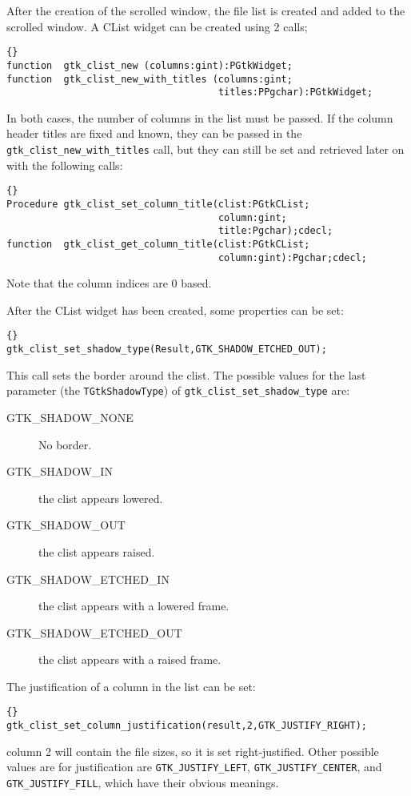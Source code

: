 \documentclass[10pt]{article}
\begin{document}
After the creation of the scrolled window, the file list is created and
added to the scrolled window. A CList widget can be created using 2 calls;
\begin{lstlisting}{}
function  gtk_clist_new (columns:gint):PGtkWidget;
function  gtk_clist_new_with_titles (columns:gint;
                                     titles:PPgchar):PGtkWidget;
\end{lstlisting}
In both cases, the number of columns in the list must be passed. If
the column header titles are fixed and known, they can be passed in the
\lstinline|gtk_clist_new_with_titles| call, but they can still be set and
retrieved later on with the following calls:
\begin{lstlisting}{}
Procedure gtk_clist_set_column_title(clist:PGtkCList;
                                     column:gint;
                                     title:Pgchar);cdecl;
function  gtk_clist_get_column_title(clist:PGtkCList;
                                     column:gint):Pgchar;cdecl;
\end{lstlisting}
Note that the column indices are 0 based.

After the CList widget has been created, some properties can be set:
\begin{lstlisting}{}
gtk_clist_set_shadow_type(Result,GTK_SHADOW_ETCHED_OUT);
\end{lstlisting}
This call sets the border around the clist. The possible values for
the last parameter (the \lstinline|TGtkShadowType|) of 
\lstinline|gtk_clist_set_shadow_type| are:
\begin{description}
\item[GTK\_SHADOW\_NONE] No border.
\item[GTK\_SHADOW\_IN] the clist appears lowered.
\item[GTK\_SHADOW\_OUT] the clist appears raised.
\item[GTK\_SHADOW\_ETCHED\_IN] the clist appears with a lowered frame.
\item[GTK\_SHADOW\_ETCHED\_OUT] the clist appears with a raised frame.
\end{description}

The justification of a column in the list can be set:
\begin{lstlisting}{}
gtk_clist_set_column_justification(result,2,GTK_JUSTIFY_RIGHT);
\end{lstlisting}
column 2 will contain the file sizes, so it is set right-justified.
Other possible values are for justification are 
\lstinline|GTK_JUSTIFY_LEFT|, \lstinline|GTK_JUSTIFY_CENTER|, and 
\lstinline|GTK_JUSTIFY_FILL|,  which have their obvious meanings.
\end{document}

